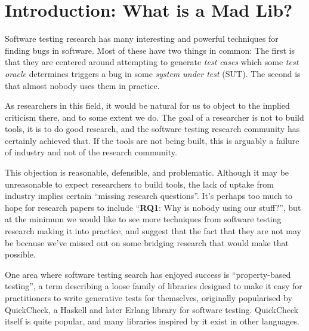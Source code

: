 \documentclass[sigplan,review]{acmart}
\begin{document}
%


%
\maketitle

\section{Introduction: What is a Mad Lib?}

Software testing research has many interesting and powerful techniques for finding bugs in software.
Most of these have two things in common:
The first is that they are centered around attempting to generate \emph{test cases} which some \emph{test oracle} determines triggers a bug in some \emph{system under test} (SUT).
The second is that almost nobody uses them in practice.

As researchers in this field, it would be natural for us to object to the implied criticism there,
and to some extent we do.
The goal of a researcher is not to build tools, it is to do good research,
and the software testing research community has certainly achieved that.
If the tools are not being built, this is arguably a failure of industry and not of the research community.

This objection is reasonable, defensible, and problematic.
Although it may be unreasonable to expect researchers to build tools,
the lack of uptake from industry implies certain ``missing research questions''.
It's perhaps too much to hope for research papers to include ``\textbf{RQ1}: Why is nobody using our stuff?'',
but at the minimum we would like to see more techniques from software testing research making it into practice,
and suggest that the fact that they are not may be because we've missed out on some bridging research that would make that possible.

One area where software testing search has enjoyed success is ``property-based testing'',
a term describing a loose family of libraries designed to make it easy for practitioners to write generative tests for themselves,
originally popularised by QuickCheck, a Haskell and later Erlang library for software testing.
QuickCheck itself is quite popular,
and many libraries inspired by it exist in other languages.
\end{document}
